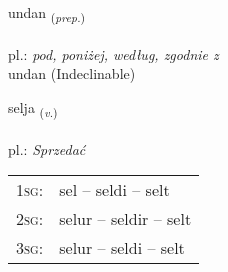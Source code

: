 \documentclass[frontgrid, backgrid]{flacards}\usepackage[]{graphicx}\usepackage[]{xcolor}
\begin{document}

\renewcommand{\flhead}{\vskip5pt \fboxsep=0pt {\small\bfseries\footnotesize Forsetning | Preposition}}
\renewcommand{\fcfoot}{\vskip5pt \fboxsep=0pt \hspace{2pt}{\small\bfseries\footnotesize 1K}}

\renewcommand{\blhead}{\vskip5pt {\small\bfseries\footnotesize Forsetning | Preposition }}
\renewcommand{\bcfoot}{\vskip5pt \hspace{2pt}{\small\bfseries\footnotesize 1K}}


{undan \small{\textsubscript{(\textit{prep.})}} \\[1ex]
\textphonetic{[ʏntan]} \\
pl.: \emph{pod, poniżej, według, zgodnie z} \\  [2ex]
undan (Indeclinable)}

\renewcommand{\flhead}{\vskip5pt \fboxsep=0pt {\small\bfseries\footnotesize Sagnorð | Verb}}
\renewcommand{\fcfoot}{\vskip5pt \fboxsep=0pt \hspace{2pt}{\small\bfseries\footnotesize 1K}}

\renewcommand{\blhead}{\vskip5pt {\small\bfseries\footnotesize Sagnorð | Verb }}
\renewcommand{\bcfoot}{\vskip5pt \hspace{2pt}{\small\bfseries\footnotesize 1K}}


{selja \small{\textsubscript{(\textit{v.})}} \\[1ex] %
\textphonetic{[sɛlja]} \\
pl.: \emph{Sprzedać} \\  [2ex]
\renewcommand*{\arraystretch}{0.8}
\begin{tabular}{p{1cm}l}
\textsc{1sg}: & sel -- seldi -- selt \\ 
\textsc{2sg}: & selur -- seldir -- selt \\ 
\textsc{3sg}: & selur -- seldi -- selt \\ 
\end{tabular}
}

\renewcommand{\flhead}{\vskip5pt \fboxsep=0pt {\small\bfseries\footnotesize Nafnorð | Noun}}
\renewcommand{\fcfoot}{\vskip5pt \fboxsep=0pt \hspace{2pt}{\small\bfseries\footnotesize 1K}}
\end{document}
